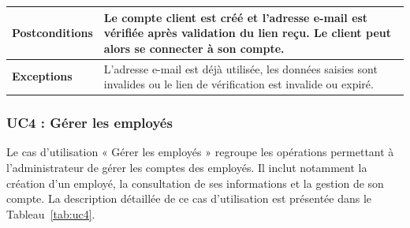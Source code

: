 \begin{longtable}{|>{\raggedright\arraybackslash}p{4cm}|>{\raggedright\arraybackslash}p{10.5cm}|}
\hline

\textbf{Postconditions} &
Le compte client est créé et l'adresse e-mail est vérifiée après validation du lien reçu. Le client peut alors se connecter à son compte. \\

\hline

\textbf{Exceptions} &
L'adresse e-mail est déjà utilisée, les données saisies sont invalides ou le lien de vérification est invalide ou expiré. \\

\hline

\end{longtable}


\vspace{-0.2cm}

\subsubsection{UC4 : Gérer les employés}

Le cas d’utilisation « Gérer les employés » regroupe les opérations permettant à l'administrateur de gérer les comptes des employés. Il inclut notamment la création d'un employé, la consultation de ses informations et la gestion de son compte. La description détaillée de ce cas d’utilisation est présentée dans le Tableau~\ref{tab:uc4}.

